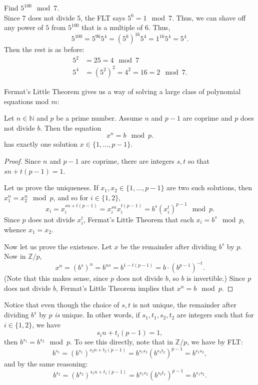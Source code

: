 \documentclass[11pt,dvipsnames]{book}
\numberwithin{equation}{section} %
\numberwithin{figure}{section} %
\numberwithin{table}{section} %
\begin{document}
\begin{example}
Find $5^{100}\mod 7$. \\

Since $7$ does not divide $5$, the FLT says $5^{6} = 1\mod 7$. Thus, we can shave off any power of $5$ from $5^{100}$ that is a multiple of $6$. Thus,
\[
5^{100} = 5^{96}5^{4}=(5^{6})^{16}5^{4} = 1^{16}5^{4}= 5^{4}.
\]
Then the rest is as before: 
\begin{align*}
5^{2} & =25 = 4\mod 7\\
5^{4} & =(5^{2})^{2} = 4^{2}=16 = 2\mod 7.
\end{align*}
\end{example}

Fermat's Little Theorem gives us a way of solving a large class of polynomial equations mod $m$:

\begin{theorem}
\label{t:x^n=bmodp}
Let $n\in\mathbb{N}$ and $p$ be a prime number. Assume $n$ and $p-1$ are coprime and $p$ does not divide $b$. Then the equation
\begin{equation}
\label{e:x^n=bmodp}
x^{n} = b\mod p.
\end{equation} 
has exactly one solution $x\in \{1,\dots,p-1\}$.
\end{theorem}

\begin{proof}
Since $n$ and $p-1$ are coprime, there are integers $s,t$ so that $sn+t(p-1)=1$. 

Let us prove the uniqueness.
If $x_1,x_2 \in \{1,\dots,p-1\}$ are two such solutions, then $x_1^n=x_2^n \mod p$, and so for $i \in \{1,2\}$,
\[
x_i = x_i^{sn+t(p-1)} = x_i^{sn}x_i^{t(p-1)} = b^s(x_i^t)^{p-1} \mod p.
\]
Since $p$ does not divide $x_i^t$, Fermat's Little Theorem that each $x_i = b^s \mod p$, whence $x_1=x_2$.

Now let us prove the existence.
Let $x$ be the remainder after dividing $b^s$ by $p$.
Now in $\mathbb{Z}/p$,
\[
x^{n}  = (b^{s})^{n}=b^{ns}  = b^{1-t(p-1)}=b\cdot (b^{p-1})^{-t}.\]
(Note that this makes sense, since $p$ does not divide $b$, so $b$ is invertible.)
Since $p$ does not divide $b$, Fermat's Little Theorem implies that $x^n = b \mod p$.
\end{proof}

Notice that even though the choice of $s, t$ is not unique, the remainder after dividing $b^s$ by $p$ \emph{is} unique.
In other words, if $s_1,t_1,s_2,t_2$ are integers such that for $i \in \{1,2\}$, we have
\[
s_in+t_i(p-1)=1,
\]
then $b^{s_1} = b^{s_2} \mod p$.
To see this directly, note that in $\mathbb{Z}/p$, we have by FLT:
\[
b^{s_1} = (b^{s_1})^{s_2n+t_2(p-1)} = b^{s_1s_2}(b^{s_1t_2})^{p-1}=b^{s_1s_2},
\]
and by the same reasoning:
\[
b^{s_2} = (b^{s_2})^{s_1n+t_1(p-1)} = b^{s_1s_2}(b^{s_2t_1})^{p-1}=b^{s_1s_2}.
\]
\end{document}

